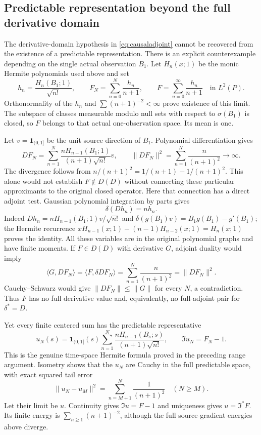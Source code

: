 \documentclass[11pt]{article}
\begin{document}
\subsection*{Predictable representation beyond the full derivative domain}
The derivative-domain hypothesis in \eqref{eq:causaladjoint} cannot be
recovered from the existence of a predictable representation. There is
an explicit counterexample depending on the single actual observation
$B_1$. Let $H_n(x;1)$ be the monic Hermite polynomials used above and set
\[
 h_n=\frac{H_n(B_1;1)}{\sqrt{n!}},\qquad
 F_N=\sum_{n=0}^N\frac{h_n}{n+1},\qquad
 F=\sum_{n=0}^\infty\frac{h_n}{n+1}\quad\text{in }L^2(P).
\]
Orthonormality of the $h_n$ and $\sum(n+1)^{-2}<\infty$ prove
existence of this limit. The subspace of classes measurable modulo
null sets with respect to $\sigma(B_1)$ is closed, so $F$ belongs to
that actual one-observation space. Its mean is one.

Let $v=\mathbf1_{(0,1]}$ be the unit source direction of $B_1$.
Polynomial differentiation gives
\[
 DF_N=\sum_{n=1}^N\frac{nH_{n-1}(B_1;1)}{(n+1)\sqrt{n!}}v,
 \qquad \|DF_N\|^2=\sum_{n=1}^N\frac{n}{(n+1)^2}\longrightarrow\infty.
\]
The divergence follows from
$n/(n+1)^2=1/(n+1)-1/(n+1)^2$.
This alone would not establish $F\notin D(D)$ without connecting
these particular approximants to the original closed operator.
Here that connection has a direct adjoint test. Gaussian polynomial
integration by parts gives
\[
 \delta(Dh_n)=nh_n.
\]
Indeed $Dh_n=nH_{n-1}(B_1;1)v/\sqrt{n!}$ and
$\delta(g(B_1)v)=B_1g(B_1)-g'(B_1)$; the Hermite recurrence
$xH_{n-1}(x;1)-(n-1)H_{n-2}(x;1)=H_n(x;1)$ proves the identity.
All these variables are in the original polynomial graphs and have
finite moments. If $F\in D(D)$ with derivative $G$, adjoint duality
would imply
\[
 \langle G,DF_N\rangle
 =\langle F,\delta DF_N\rangle
 =\sum_{n=1}^N\frac{n}{(n+1)^2}=\|DF_N\|^2.
\]
Cauchy--Schwarz would give $\|DF_N\|\le\|G\|$ for every $N$, a
contradiction. Thus $F$ has no full derivative value and, equivalently,
no full-adjoint pair for $\delta^*=D$.

Yet every finite centered sum has the predictable representative
\[
 u_N(s)=\mathbf1_{(0,1]}(s)
       \sum_{n=1}^N\frac{nH_{n-1}(B_s;s)}{(n+1)\sqrt{n!}},
 \qquad \mathfrak Iu_N=F_N-1.
\]
This is the genuine time-space Hermite formula proved in the preceding
range argument. Isometry shows that the $u_N$ are Cauchy in the full
predictable space, with exact squared tail error
\[
 \|u_N-u_M\|^2=\sum_{n=M+1}^N\frac1{(n+1)^2}\quad(N\ge M).
\]
Let their limit be $u$. Continuity gives
$\mathfrak Iu=F-1$ and uniqueness gives $u=\mathfrak I^*F$.
Its finite energy is $\sum_{n\ge1}(n+1)^{-2}$, although the full
source-gradient energies above diverge.
\end{document}
